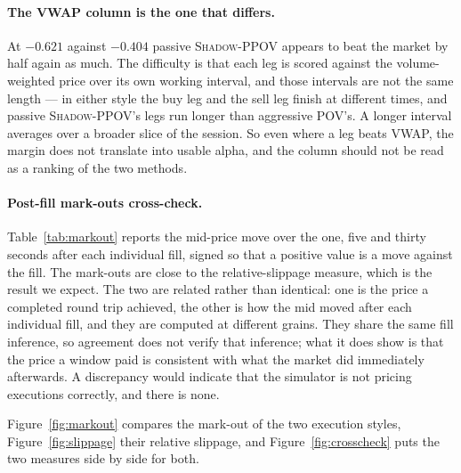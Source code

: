 \documentclass[11pt]{article}
\newcommand{\pov}{\textsc{Shadow-PPOV}}
\begin{document}
\paragraph{The VWAP column is the one that differs.}
At $-0.621$ against $-0.404$ passive \pov{} appears to beat the market by half
again as much. The difficulty is that each leg is scored against the
volume-weighted price over its own working interval, and those intervals are not
the same length --- in either style the buy leg and the sell leg finish at
different times, and passive \pov{}'s legs run longer than aggressive POV's. A
longer interval averages over a broader slice of the session. So even
where a leg beats VWAP, the margin does not translate into usable alpha, and the
column should not be read as a ranking of the two methods.

\paragraph{Post-fill mark-outs cross-check.} Table~\ref{tab:markout} reports the
mid-price move over the one, five and thirty seconds after each individual fill,
signed so that a positive value is a move against the fill. The mark-outs are
close to the relative-slippage measure, which is the result we expect. The two
are related rather than identical: one is the price a completed round trip
achieved, the other is how the mid moved after each individual fill, and they are
computed at different grains. They share the same fill inference, so agreement
does not verify that inference; what it does show is that the price a window
paid is consistent with what the market did immediately afterwards. A
discrepancy would indicate that the simulator is not pricing executions
correctly, and there is none.

Figure~\ref{fig:markout} compares the mark-out of the two execution styles,
Figure~\ref{fig:slippage} their relative slippage, and Figure~\ref{fig:crosscheck} puts
the two measures side by side for both.
\end{document}
